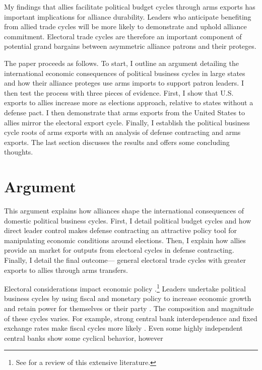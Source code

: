 \documentclass[12pt]{article}
\begin{document}
My findings that allies facilitate political budget cycles through arms exports has important implications for alliance durability. 
Leaders who anticipate benefiting from allied trade cycles will be more likely to demonstrate and uphold alliance commitment. 
Electoral trade cycles are therefore an important component of potential grand bargains between asymmetric alliance patrons and their proteges. 


The paper proceeds as follows. 
To start, I outline an argument detailing the international economic consequences of political business cycles in large states and how their alliance proteges use arms imports to support patron leaders. 
I then test the process with three pieces of evidence. 
First, I show that U.S. exports to allies increase more as elections approach, relative to states without a defense pact. 
I then demonstrate that arms exports from the United States to allies mirror the electoral export cycle.
Finally, I establish the political business cycle roots of arms exports with an analysis of defense contracting and arms exports.
The last section discusses the results and offers some concluding thoughts.


\section{Argument}


This argument explains how alliances shape the international consequences of domestic political business cycles. 
First, I detail political budget cycles and how direct leader control makes defense contracting an attractive policy tool for manipulating economic conditions around elections. 
Then, I explain how allies provide an market for outputs from electoral cycles in defense contracting. 
Finally, I detail the final outcome--- general electoral trade cycles with greater exports to allies through arms transfers. 


Electoral considerations impact economic policy \citep{Nordhaus1975}.\footnote{See \citet{Dubois2016} for a review of this extensive literature.} 
Leaders undertake political business cycles by using fiscal and monetary policy to increase economic growth and retain power for themselves or their party \citep{Tufte1978, Rogoff1987}. 
The composition and magnitude of these cycles varies. 
For example, strong central bank interdependence and fixed exchange rates make fiscal cycles more likely \citep{ClarkHallerberg2000}. 
Even some highly independent central banks show some cyclical behavior, however \citep[pg. 247]{Dubois2016}
\end{document}
